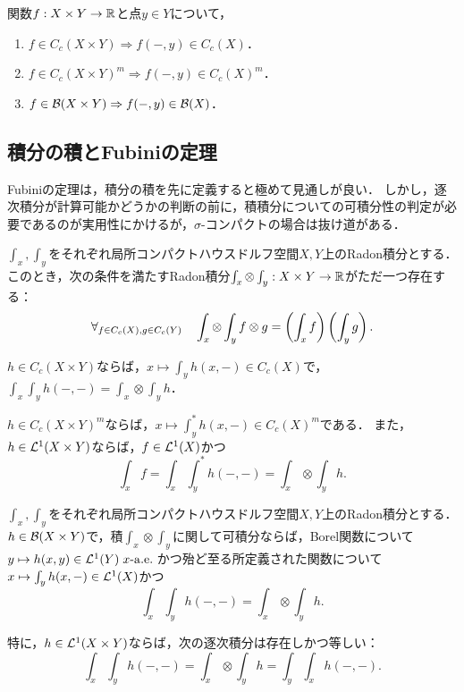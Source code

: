 \documentclass[uplatex,dvipdfmx]{jsreport}
\begin{document}
\begin{lemma}
    関数$f:X\times Y\to\mathbb{R}$と点$y\in Y$について，
    \begin{enumerate}
        \item $f\in C_c(X\times Y)\Rightarrow f(-,y)\in C_c(X)$．
        \item $f\in C_c(X\times Y)^m\Rightarrow f(-,y)\in C_c(X)^m$．
        \item $f\in\mathcal{B}(X\times Y)\Rightarrow f(-,y)\in\mathcal{B}(X)$．
    \end{enumerate}
\end{lemma}

\subsection{積分の積とFubiniの定理}

\begin{tcolorbox}[colframe=ForestGreen, colback=ForestGreen!10!white,breakable,colbacktitle=ForestGreen!40!white,coltitle=black,fonttitle=\bfseries\sffamily,
title=]
    Fubiniの定理は，積分の積を先に定義すると極めて見通しが良い．
    しかし，逐次積分が計算可能かどうかの判断の前に，積積分についての可積分性の判定が必要であるのが実用性にかけるが，$\sigma$-コンパクトの場合は抜け道がある．
\end{tcolorbox}

\begin{proposition}
    $\int_x,\int_y$をそれぞれ局所コンパクトハウスドルフ空間$X,Y$上のRadon積分とする．
    このとき，次の条件を満たすRadon積分$\int_x\otimes\int_y:X\times Y\to\mathbb{R}$がただ一つ存在する：
    \[\forall_{f\in C_c(X),g\in C_c(Y)}\quad\int_x\otimes\int_yf\otimes g=\left(\int_xf\right)\left(\int_yg\right).\]
\end{proposition}

\begin{lemma}
    $h\in C_c(X\times Y)$ならば，$x\mapsto\int_yh(x,-)\in C_c(X)$で，$\int_x\int_yh(-,-)=\int_x\otimes\int_yh$．
\end{lemma}

\begin{lemma}
    $h\in C_c(X\times Y)^m$ならば，$x\mapsto\int_y^*h(x,-)\in C_c(X)^m$である．
    また，$h\in\mathcal{L}^1(X\times Y)$ならば，$f\in\mathcal{L}^1(X)$かつ
    \[\int_xf=\int_x\int_y^*h(-,-)=\int_x\otimes\int_yh.\]
\end{lemma}

\begin{theorem}[Fubini]
    $\int_x,\int_y$をそれぞれ局所コンパクトハウスドルフ空間$X,Y$上のRadon積分とする．
    $h\in\mathcal{B}(X\times Y)$で，積$\int_x\otimes\int_y$に関して可積分ならば，Borel関数について$y\mapsto h(x,y)\in\mathcal{L}^1(Y)\;x\text{-}\mathrm{a.e.}\;$かつ殆ど至る所定義された関数について$x\mapsto\int_yh(x,-)\in\mathcal{L}^1(X)$かつ
    \[\int_x\int_yh(-,-)=\int_x\otimes\int_yh.\]
\end{theorem}
\begin{remarks}
    特に，$h\in\mathcal{L}^1(X\times Y)$ならば，次の逐次積分は存在しかつ等しい：\[\int_x\int_yh(-,-)=\int_x\otimes\int_yh=\int_y\int_xh(-,-).\]
\end{remarks}
\end{document}
